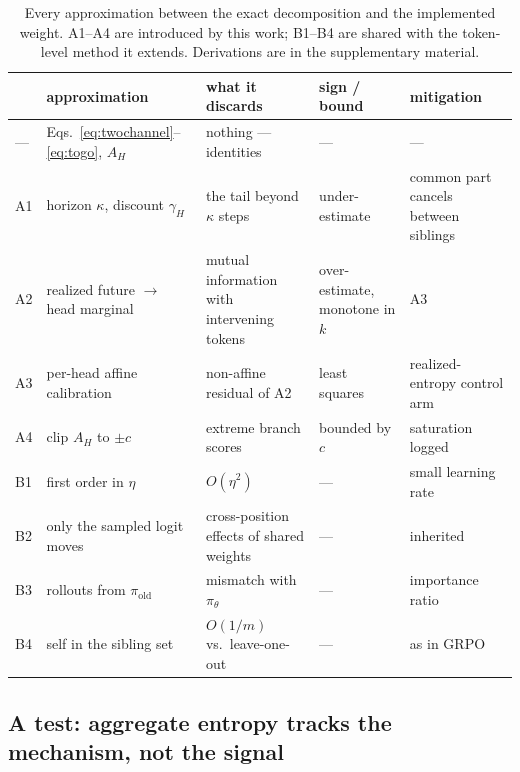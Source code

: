 \documentclass[runningheads]{llncs}
\newcommand{\AH}{A_{H}}
\newcommand{\pit}{\pi_{\theta}}
\begin{document}
\begin{table}[t]
\caption{Every approximation between the exact decomposition and the implemented weight.
A1--A4 are introduced by this work; B1--B4 are shared with the token-level method it
extends. Derivations are in the supplementary material.}
\label{tab:ledger}
\centering
\footnotesize
\setlength{\tabcolsep}{3pt}
\begin{tabular}{@{}l>{\raggedright}p{2.4cm}>{\raggedright}p{3.4cm}>{\raggedright}p{1.8cm}>{\raggedright\arraybackslash}p{2.9cm}@{}}
\toprule
& approximation & what it discards & sign / bound & mitigation \\
\midrule
--- & Eqs.~\eqref{eq:twochannel}--\eqref{eq:togo}, $\AH$ & nothing --- identities & --- & --- \\
A1 & horizon $\kappa$, discount $\gamma_H$ & the tail beyond $\kappa$ steps & under-estimate & common part cancels between siblings \\
A2 & realized future $\to$ head marginal & mutual information with intervening tokens & over-estimate, monotone in $k$ & A3 \\
A3 & per-head affine calibration & non-affine residual of A2 & least squares & realized-entropy control arm \\
A4 & clip $\AH$ to $\pm c$ & extreme branch scores & bounded by $c$ & saturation logged \\
B1 & first order in $\eta$ & $O(\eta^2)$ & --- & small learning rate \\
B2 & only the sampled logit moves & cross-position effects of shared weights & --- & inherited \\
B3 & rollouts from $\pi_{\mathrm{old}}$ & mismatch with $\pit$ & --- & importance ratio \\
B4 & self in the sibling set & $O(1/m)$ vs.\ leave-one-out & --- & as in GRPO \\
\bottomrule
\end{tabular}
\end{table}

\subsection{A test: aggregate entropy tracks the mechanism, not the signal}
\label{sec:dissoc}
\end{document}
